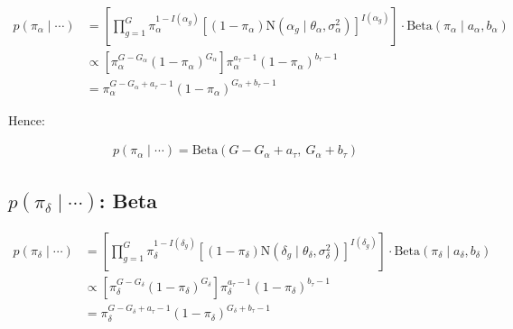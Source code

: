 \documentclass{article}\usepackage{graphicx, color}
\begin{document}
\begin{flushleft}
\begin{align*}
p(\pi_\alpha \mid \cdots) &=\left [ \prod_{g = 1}^G  \pi_\alpha^{1-I(\alpha_g)}[(1- \pi_\alpha)\text{N}(\alpha_g \mid \theta_\alpha, \sigma_\alpha^2)]^{I(\alpha_g)} \right ] \cdot \text{Beta}(\pi_\alpha \mid a_\alpha, b_\alpha)  \\
&\propto [\pi_\alpha^{G - G_\alpha}(1-\pi_\alpha)^{G_\alpha}] \pi_\alpha^{a_\tau - 1} (1 - \pi_\alpha)^{b_\tau - 1} \\
&= \pi_{\alpha}^{G - G_\alpha + a_\tau - 1}(1 - \pi_\alpha)^{G_\alpha + b_\tau - 1}
\end{align*}

Hence:

\begin{align*}
p(\pi_\alpha \mid \cdots) = \text{Beta}(G - G_\alpha + a_\tau, \ G_\alpha + b_\tau)
\end{align*}









































\subsection{$p(\pi_\delta \mid \cdots)$: Beta}

\begin{align*}
p(\pi_\delta \mid \cdots) &=\left [ \prod_{g = 1}^G  \pi_\delta^{1-I(\delta_g)}[(1- \pi_\delta)\text{N}(\delta_g \mid \theta_\delta, \sigma_\delta^2)]^{I(\delta_g)} \right ] \cdot \text{Beta}(\pi_\delta \mid a_\delta, b_\delta)  \\
&\propto [\pi_\delta^{G - G_\delta}(1-\pi_\delta)^{G_\delta}] \pi_\delta^{a_\tau - 1} (1 - \pi_\delta)^{b_\tau - 1} \\
&= \pi_{\delta}^{G - G_\delta + a_\tau - 1}(1 - \pi_\delta)^{G_\delta + b_\tau - 1}
\end{align*}


\end{flushleft}
\end{document}
